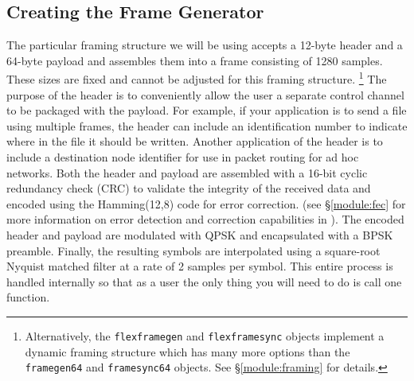\subsection{Creating the Frame Generator}
\label{tutorial:framing:framegen}
The particular framing structure we will be using accepts a 12-byte
header and a 64-byte payload and assembles them into a frame
consisting of 1280 samples.
These sizes are fixed and cannot be adjusted for this framing
structure.%
\footnote{
    Alternatively, the {\tt flexframegen} and {\tt flexframesync}
    objects implement a dynamic framing structure which has many more
    options than the {\tt framegen64} and {\tt framesync64} objects.
    See \S\ref{module:framing} for details.}
The purpose of the header is to conveniently allow the user a separate
control channel to be packaged with the payload.
For example, if your application is to send a file using multiple
frames, the header can include an identification number to indicate
where in the file it should be written.
Another application of the header is to include a destination node
identifier for use in packet routing for ad hoc networks.
Both the header and payload are assembled with a 16-bit cyclic
redundancy check (CRC) to validate the integrity of the received data
and encoded using the Hamming(12,8) code for error correction.
(see \S\ref{module:fec} for more information on error detection
and correction capabilities in \liquid).
The encoded header and payload are modulated with QPSK and encapsulated
with a BPSK preamble.
Finally, the resulting symbols are interpolated using a square-root
Nyquist matched filter at a rate of 2 samples per symbol.
This entire process is handled internally so that as a user the only
thing you will need to do is call one function.

